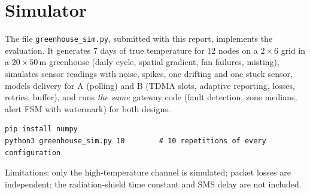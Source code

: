 \documentclass[11pt,a4paper]{report}
\begin{document}
\appendix
\chapter{Simulator}\label{app:sim}
The file \texttt{greenhouse\_sim.py}, submitted with this report, implements the evaluation. It generates 7 days of true temperature for 12 nodes on a $2\times6$ grid in a $20\times50$\,m greenhouse (daily cycle, spatial gradient, fan failures, misting), simulates sensor readings with noise, spikes, one drifting and one stuck sensor, models delivery for A (polling) and B (TDMA slots, adaptive reporting, losses, retries, buffer), and runs \emph{the same} gateway code (fault detection, zone medians, alert FSM with watermark) for both designs.
\begin{lstlisting}
pip install numpy
python3 greenhouse_sim.py 10        # 10 repetitions of every configuration
\end{lstlisting}
Limitations: only the high-temperature channel is simulated; packet losses are independent; the radiation-shield time constant and SMS delay are not included.
\end{document}
